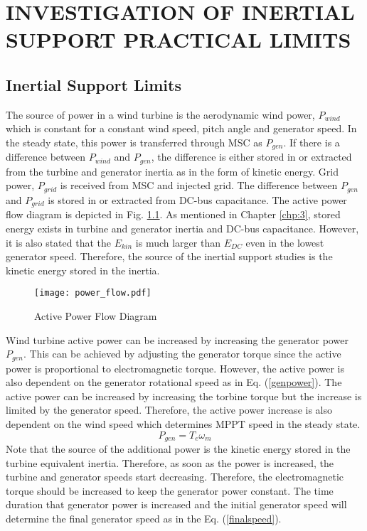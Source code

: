 \chapter{INVESTIGATION OF INERTIAL SUPPORT PRACTICAL LIMITS}
\label{chp:4}
\section{Inertial Support Limits}
\label{sec:klimit}
The source of power in a wind turbine is the aerodynamic wind power, $P_{wind}$ which is constant for a constant wind speed, pitch angle and generator speed. In the steady state, this power is transferred through MSC as $P_{gen}$. If there is a difference between $P_{wind}$ and $P_{gen}$, the difference is either stored in or extracted from the turbine and generator inertia as in the form of kinetic energy. Grid power, $P_{grid}$ is received from MSC and injected grid. The difference between $P_{gen}$ and $P_{grid}$ is stored in or extracted from DC-bus capacitance. The active power flow diagram is depicted in Fig. \ref{power_flow}. As mentioned in Chapter \ref{chp:3}, stored energy exists in turbine and generator inertia and DC-bus capacitance. However, it is also stated that the $E_{kin}$ is much larger than $E_{DC}$ even in the lowest generator speed. Therefore, the source of the inertial support studies is the kinetic energy stored in the inertia. \par
\begin{figure}[h!]
	\centering
	\texttt{[image: power\_flow.pdf]}
	\caption{Active Power Flow Diagram}
	\label{power_flow}
\end{figure}
Wind turbine active power can be increased by increasing the generator power $P_{gen}$. This can be achieved by adjusting the generator torque since the active power is proportional to electromagnetic torque. However, the active power is also dependent on the generator rotational speed as in Eq. (\ref{genpower}). The active power can be increased by increasing the torbine torque but the increase is limited by the generator speed. Therefore, the active power increase is also dependent on the wind speed which determines MPPT speed in the steady state.
\begin{equation}
P_{gen}=T_{e} \omega_{m}
\label{genpower}
\end{equation}
Note that the source of the additional power is the kinetic energy stored in the turbine equivalent inertia. Therefore, as soon as the power is increased, the turbine and generator speeds start decreasing. Therefore, the electromagnetic torque should be increased to keep the generator power constant. The time duration that generator power is increased and the initial generator speed will determine the final generator speed as in the Eq. (\ref{finalspeed}).
